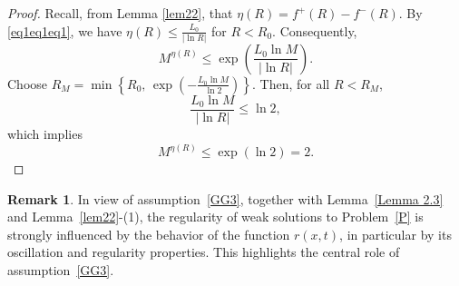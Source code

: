 \documentclass[10pt,reqno]{amsart}
\newcommand *\w{^\wedge}
\theoremstyle{definition}
\newtheorem{remark}[theorem]{Remark}
\numberwithin{equation}{section}
\begin{document}
\begin{proof}
Recall, from Lemma \ref{lem22}, that $\eta(R) = f^+(R) - f^-(R)$. By \eqref{eq1eq1eq1}, we have $\eta(R) \leq \frac{L_0}{|\ln R|}$ for $R < R_0$. Consequently,
\[
M^{\eta(R)} \leq \exp\left( \frac{L_0 \ln M}{|\ln R|} \right).
\]
Choose $R_M = \min\left\{ R_0,\, \exp\left( -\frac{L_0 \ln M}{\ln 2} \right) \right\}$. Then, for all $R < R_M$,
\[
\frac{L_0 \ln M}{|\ln R|} \leq \ln 2,
\]
which implies
\[
M^{\eta(R)} \leq \exp(\ln 2) = 2.
\]
\end{proof}
\begin{remark}
In view of assumption~\eqref{GG3}, together with Lemma~\ref{Lemma 2.3} and Lemma~\ref{lem22}-(1), the regularity of weak solutions to Problem~\eqref{P} is strongly influenced by the behavior of the function $r(x,t)$, in particular by its oscillation and regularity properties. This highlights the central role of assumption~\eqref{GG3}.
\end{remark}
\end{document}
